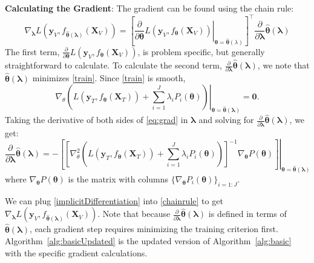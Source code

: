 \documentclass[10pt,letterpaper]{article}
\begin{document}
\noindent
\textbf{Calculating the Gradient}:
The gradient can be found using the chain rule:
\begin{equation}
\nabla_{\boldsymbol{\lambda}} L \left( \boldsymbol{y}_V, f_{\hat{\boldsymbol \theta}(\boldsymbol{\lambda})}(\boldsymbol{X}_V) \right ) = 
\left [
\left . \frac{\partial}{\partial \boldsymbol \theta} L ( \boldsymbol{y}_V, f_{\boldsymbol \theta}(\boldsymbol{X}_V)) \right |_{\boldsymbol \theta=\hat{\boldsymbol \theta}(\lambda)}
\right ]^\top 
\frac{\partial}{\partial \boldsymbol{\lambda}} \hat{\boldsymbol \theta}(\boldsymbol{\lambda})
\label{chainrule}
\end{equation}
The first term, $\frac{\partial}{\partial \boldsymbol \theta} L ( \boldsymbol{y}_V, f_{\boldsymbol \theta}(\boldsymbol{X}_V))$, is problem specific, but generally straightforward to calculate. To calculate the second term, $\frac{\partial}{\partial \boldsymbol{\lambda}} \hat{\boldsymbol \theta}(\boldsymbol{\lambda})$, we note that $\hat{\boldsymbol \theta}(\boldsymbol{\lambda})$ minimizes \eqref{train}. Since \eqref{train} is smooth,
\begin{equation}
\nabla_\theta 
\left . \left (
L(\boldsymbol{y}_T, f_{\boldsymbol \theta} (\boldsymbol{X}_T)) +
\sum\limits_{i=1}^J \lambda_i P_i(\boldsymbol \theta)
\right ) \right |_{\boldsymbol \theta = \hat {\boldsymbol \theta}(\boldsymbol{\lambda})}
= \boldsymbol{0}.
\label{eq:grad}
\end{equation}
Taking the derivative of both sides of \eqref{eq:grad} in $\boldsymbol{\lambda}$ and solving for $\frac{\partial}{\partial \boldsymbol{\lambda}} \hat{\boldsymbol \theta}(\boldsymbol{\lambda})$, we get:
\begin{equation}
\frac{\partial}{\partial \boldsymbol{\lambda}} \hat{\boldsymbol \theta}(\boldsymbol{\lambda}) = 
- \left . \left [ \left [
 \nabla_\theta^2 \left (  L \left (\boldsymbol{y}_T, f_{\boldsymbol \theta} (\boldsymbol{X}_T) \right)  +  \sum\limits_{i=1}^J \lambda_i P_i(\boldsymbol \theta)  \right )  \right ]^{-1}
\nabla_{\boldsymbol \theta} P(\boldsymbol \theta)
\right ]
\right |_{\boldsymbol \theta = \hat {\boldsymbol \theta}(\boldsymbol{\lambda})}
\label{implicitDifferentiation}
\end{equation}
where $\nabla_{\boldsymbol \theta} P(\boldsymbol \theta)$ is the matrix with columns $\{\nabla_{\boldsymbol \theta} P_i(\boldsymbol \theta)\}_{i=1:J}$.

We can plug \eqref{implicitDifferentiation} into \eqref{chainrule} to get $\nabla_{\boldsymbol{\lambda}} L \left ( \boldsymbol{y}_V, f_{\hat{\boldsymbol \theta}(\boldsymbol{\lambda})}(\boldsymbol{X}_V) \right )$. Note that because $\frac{\partial}{\partial \boldsymbol{\lambda}} \hat{\boldsymbol \theta}(\boldsymbol{\lambda})$ is defined in terms of $\hat{\boldsymbol \theta}\left(\boldsymbol{\lambda}\right)$, each gradient step requires minimizing the training criterion first. Algorithm~\ref{alg:basicUpdated} is the updated version of Algorithm~\ref{alg:basic} with the specific gradient calculations.
\end{document}
